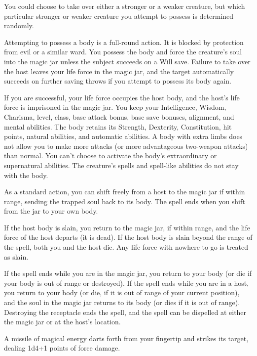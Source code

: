 \begin{multicols}{2}
\begin{small}
\smallskip\noindent You could choose to take over either a stronger or a weaker creature, but which particular stronger or weaker creature you attempt to possess is determined randomly.

\smallskip\noindent Attempting to possess a body is a full-round action. It is blocked by protection from evil or a similar ward. You possess the body and force the creature's soul into the magic jar unless the subject succeeds on a Will save. Failure to take over the host leaves your life force in the magic jar, and the target automatically succeeds on further saving throws if you attempt to possess its body again.

\smallskip\noindent If you are successful, your life force occupies the host body, and the host's life force is imprisoned in the magic jar. You keep your Intelligence, Wisdom, Charisma, level, class, base attack bonus, base save bonuses, alignment, and mental abilities. The body retains its Strength, Dexterity, Constitution, hit points, natural abilities, and automatic abilities. A body with extra limbs does not allow you to make more attacks (or more advantageous two-weapon attacks) than normal. You can't choose to activate the body's extraordinary or supernatural abilities. The creature's spells and spell-like abilities do not stay with the body.

\smallskip\noindent As a standard action, you can shift freely from a host to the magic jar if within range, sending the trapped soul back to its body. The spell ends when you shift from the jar to your own body.

\smallskip\noindent If the host body is slain, you return to the magic jar, if within range, and the life force of the host departs (it is dead). If the host body is slain beyond the range of the spell, both you and the host die. Any life force with nowhere to go is treated as slain.

\smallskip\noindent If the spell ends while you are in the magic jar, you return to your body (or die if your body is out of range or destroyed). If the spell ends while you are in a host, you return to your body (or die, if it is out of range of your current position), and the soul in the magic jar returns to its body (or dies if it is out of range). Destroying the receptacle ends the spell, and the spell can be dispelled at either the magic jar or at the host's location.


\noindent A missile of magical energy darts forth from your fingertip and strikes its target, dealing 1d4+1 points of force damage.


\end{small}
\end{multicols}
